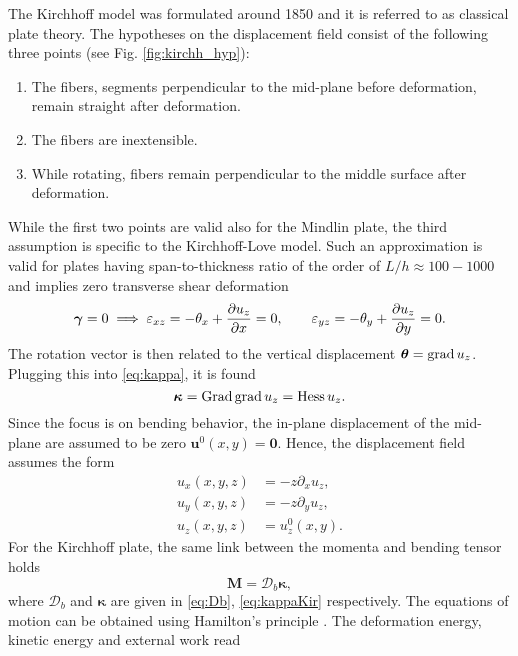 The Kirchhoff model was formulated around 1850 and it is referred to as classical plate theory. The hypotheses on the displacement field consist of the following three points (see Fig. \ref{fig:kirchh_hyp}):
\begin{enumerate}
\item The fibers, segments perpendicular to the mid-plane before deformation, remain straight after deformation.
\item The fibers are inextensible.
\item While rotating, fibers remain perpendicular to the
middle surface after deformation.
\end{enumerate}
While the first two points are valid also for the Mindlin plate, the third assumption is  specific to the Kirchhoff-Love model. Such an approximation is valid for plates having span-to-thickness ratio of the order of $L/h \approx 100 - 1000$ and implies zero transverse shear deformation
\begin{equation*}
\bm{\gamma}=0 \implies \varepsilon_{xz}= - \theta_x + \diffp{u_z}{x} = 0, \qquad \varepsilon_{yz}=-\theta_y + \diffp{u_z}{y} = 0.
\end{equation*}
The rotation vector is then related to the vertical displacement $\bm{\theta} = \operatorname*{grad} u_z$. Plugging this into \eqref{eq:kappa}, it is found
\begin{equation}\label{eq:kappaKir}
	\bm{\kappa} = \operatorname*{Grad} \operatorname*{grad} u_z = \operatorname*{Hess} u_z.
\end{equation}
Since the focus is on bending behavior, the in-plane displacement of the mid-plane are assumed to be zero $\bm{u}^0(x,y)=\bm{0}$. Hence, the displacement field assumes the form
\begin{equation}
\begin{aligned}
u_x(x,y,z) &= -z \partial_x {u_z}, \\
u_y(x,y,z) &= -z \partial_y {u_z}, \\
u_z(x,y,z) &= u_z^0(x,y).
\end{aligned}
\end{equation}
For the Kirchhoff plate, the same link between the momenta and bending tensor holds
\begin{equation*} 
\bm{M} = \bm{\mathcal{D}}_b \bm{\kappa},
\end{equation*} 
where $\bm{\mathcal{D}}_b$ and $\bm{\kappa}$ are given in \eqref{eq:Db}, \eqref{eq:kappaKir} respectively. The equations of motion can be obtained using Hamilton's principle \cite[Chapter 2]{reddy2006theory}. The deformation energy, kinetic energy and external work read
